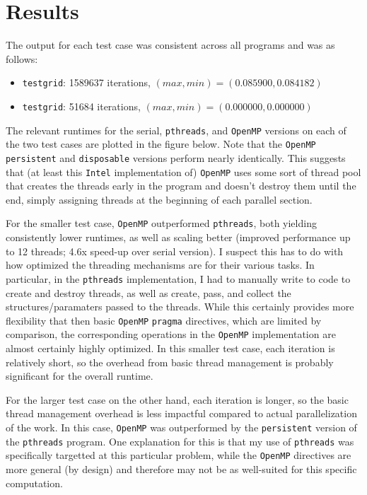 \documentclass{article}
\begin{document}
\newpage
\section*{Results}
\label{sec:results}

The output for each test case was consistent across all programs and was as follows:
\begin{itemize}
    \item \texttt{testgrid}: 1589637 iterations, $(max, min) = (0.085900, 0.084182)$
    \item \texttt{testgrid}: 51684 iterations, $(max, min) = (0.000000, 0.000000)$
\end{itemize}

The relevant runtimes for the serial, \texttt{pthreads}, and \texttt{OpenMP}
versions on each of the two test cases are plotted in the figure below. Note
that the \texttt{OpenMP} \texttt{persistent} and \texttt{disposable} versions
perform nearly identically. This suggests that (at least this \texttt{Intel}
implementation of) \texttt{OpenMP} uses some sort of thread pool that creates
the threads early in the program and doesn't destroy them until the end, simply
assigning threads at the beginning of each parallel section.

For the smaller test case, \texttt{OpenMP} outperformed \texttt{pthreads}, both
yielding consistently lower runtimes, as well as scaling better (improved
performance up to 12 threads; 4.6x speed-up over serial version). I suspect
this has to do with how optimized the threading mechanisms are for their
various tasks. In particular, in the \texttt{pthreads} implementation, I had to
manually write to code to create and destroy threads, as well as create, pass,
and collect the structures/paramaters passed to the threads. While this
certainly provides more flexibility that then basic \texttt{OpenMP}
\texttt{pragma} directives, which are limited by comparison, the corresponding
operations in the \texttt{OpenMP} implementation are almost certainly highly
optimized. In this smaller test case, each iteration is relatively short, so
the overhead from basic thread management is probably significant for the
overall runtime.

For the larger test case on the other hand, each iteration is longer, so the
basic thread management overhead is less impactful compared to actual
parallelization of the work.  In this case, \texttt{OpenMP} was outperformed by
the \texttt{persistent} version of the \texttt{pthreads} program. One
explanation for this is that my use of \texttt{pthreads} was specifically
targetted at this particular problem, while the \texttt{OpenMP} directives are
more general (by design) and therefore may not be as well-suited for this
specific computation.
\end{document}
